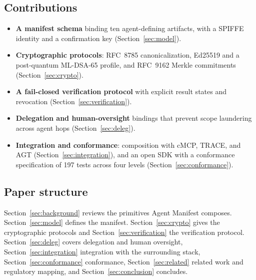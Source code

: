 \subsection*{Contributions}

\begin{itemize}[leftmargin=1.5em]
  \item \textbf{A manifest schema} binding ten agent-defining artifacts, with a
    SPIFFE identity and a confirmation key (Section~\ref{sec:model}).
  \item \textbf{Cryptographic protocols}: RFC~8785 canonicalization, Ed25519 and a
    post-quantum ML-DSA-65 profile, and RFC~9162 Merkle commitments
    (Section~\ref{sec:crypto}).
  \item \textbf{A fail-closed verification protocol} with explicit result states and
    revocation (Section~\ref{sec:verification}).
  \item \textbf{Delegation and human-oversight} bindings that prevent scope laundering
    across agent hops (Section~\ref{sec:deleg}).
  \item \textbf{Integration and conformance}: composition with cMCP, TRACE, and
    AGT (Section~\ref{sec:integration}), and an open SDK with a conformance specification
    of 197 tests across four levels (Section~\ref{sec:conformance}).
\end{itemize}

\subsection*{Paper structure}

Section~\ref{sec:background} reviews the primitives Agent Manifest composes.
Section~\ref{sec:model} defines the manifest. Section~\ref{sec:crypto} gives the
cryptographic protocols and Section~\ref{sec:verification} the verification protocol.
Section~\ref{sec:deleg} covers delegation and human oversight,
Section~\ref{sec:integration} integration with the surrounding stack,
Section~\ref{sec:conformance} conformance, Section~\ref{sec:related} related work and
regulatory mapping, and Section~\ref{sec:conclusion} concludes.
